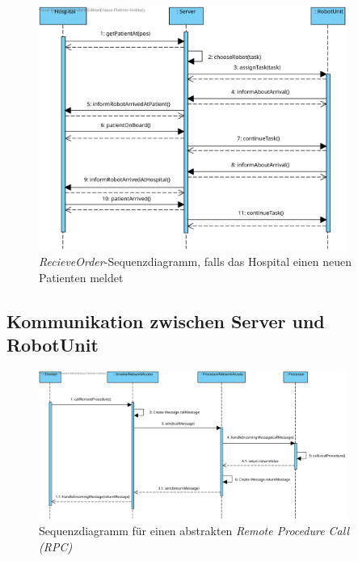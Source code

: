 \begin{figure}[H]
	\centering
	\includegraphics[width=0.9\textwidth]{img/2-Entwurf-ReceiveOrder-Hosp}
	\caption{\emph{RecieveOrder}-Sequenzdiagramm, falls das Hospital einen neuen Patienten meldet}
	\label{SequenzDiagrammInteraktionHospital}
\end{figure}


\subsection*{Kommunikation zwischen Server und RobotUnit}

\begin{figure}[H]
	\centering
	\includegraphics[width=0.9\textwidth]{img/2-Entwurf-Communication_RPC}
	\caption{Sequenzdiagramm für einen abstrakten \emph{Remote Procedure Call (RPC)}}
	\label{SequenzDiagrammRPC}
\end{figure}

